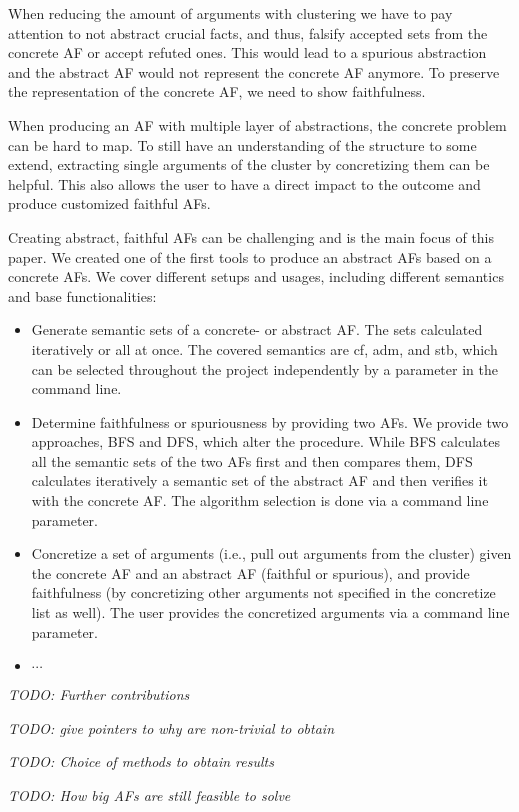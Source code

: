 When reducing the amount of arguments with clustering we have to pay attention to not abstract crucial facts, and thus, falsify accepted sets from the concrete \ac{AF} or accept refuted ones. This would lead to a spurious abstraction and the abstract \ac{AF} would not represent the concrete \ac{AF} anymore. To preserve the representation of the concrete \ac{AF}, we need to show faithfulness.

When producing an \ac{AF} with multiple layer of abstractions, the concrete problem can be hard to map. To still have an understanding of the structure to some extend, extracting single arguments of the cluster by concretizing them can be helpful. This also allows the user to have a direct impact to the outcome and produce customized faithful \acp{AF}.  


Creating abstract, faithful \acp{AF} can be challenging and is the main focus of this paper. We created one of the first tools \cite{Pasero2024-AFClustering-Repo} to produce an abstract \acp{AF} based on a concrete \acp{AF}. We cover different setups and usages, including different semantics and base functionalities:

\begin{itemize}
    \item Generate semantic sets of a concrete- or abstract \ac{AF}. The sets calculated iteratively or all at once. The covered semantics are \ac{cf}, \ac{adm}, and \ac{stb}, which can be selected throughout the project independently by a parameter in the command line.

    \item Determine faithfulness or spuriousness by providing two \acp{AF}. We provide two approaches, \ac{BFS} and \ac{DFS}, which alter the procedure. While \ac{BFS} calculates all the semantic sets of the two \acp{AF} first and then compares them, \ac{DFS} calculates iteratively a semantic set of the abstract \ac{AF} and then verifies it with the concrete \ac{AF}. The algorithm selection is done via a command line parameter.

    \item Concretize a set of arguments (i.e., pull out arguments from the cluster) given the concrete \ac{AF} and an abstract \ac{AF} (faithful or spurious), and provide faithfulness (by concretizing other arguments not specified in the concretize list as well). The user provides the concretized arguments via a command line parameter.

    \item $\cdots$
\end{itemize}

\noindent

\textit{TODO: Further contributions}

\textit{TODO: give pointers to why are non-trivial to obtain}

\textit{TODO: Choice of methods to obtain results}

\textit{TODO: How big AFs are still feasible to solve}
